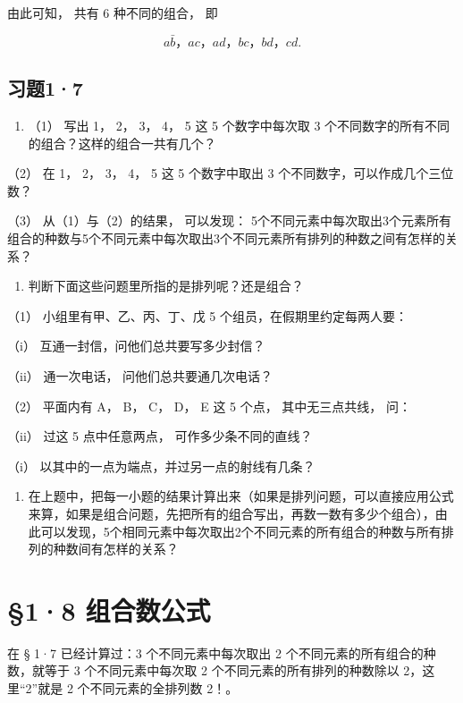 由此可知， 共有 6 种不同的组合， 即

\[
a \bar {b}\text{，} a c\text{，} a d\text{，} b c\text{，} b d\text{，} c d.
\]

\subsection{习题1·7}

\begin{enumerate}
\item
  （1） 写出 1， 2， 3， 4， 5 这 5 个数字中每次取 3
  个不同数字的所有不同的组合？这样的组合一共有几个？
\end{enumerate}

（2） 在 1， 2， 3， 4， 5 这 5 个数字中取出 3
个不同数字，可以作成几个三位数？

（3） 从（1）与（2）的结果， 可以发现：
5个不同元素中每次取出3个元素所有组合的种数与5个不同元素中每次取出3个不同元素所有排列的种数之间有怎样的关系？

\begin{enumerate}[start=2]
\item
  判断下面这些问题里所指的是排列呢？还是组合？
\end{enumerate}

（1） 小组里有甲、乙、丙、丁、戊 5 个组员，在假期里约定每两人要：

（i） 互通一封信，问他们总共要写多少封信？

（ii） 通一次电话， 问他们总共要通几次电话？

（2） 平面内有 A， B， C， D， E 这 5 个点， 其中无三点共线， 问：

（ii） 过这 5 点中任意两点， 可作多少条不同的直线？

（i） 以其中的一点为端点，并过另一点的射线有几条？

\begin{enumerate}[start=3]
\item
  在上题中，把每一小题的结果计算出来（如果是排列问题，可以直接应用公式来算，如果是组合问题，先把所有的组合写出，再数一数有多少个组合），由此可以发现，5个相同元素中每次取出2个不同元素的所有组合的种数与所有排列的种数间有怎样的关系？
\end{enumerate}

\section{§1·8 组合数公式}

在 § 1·7 已经计算过：3 个不同元素中每次取出 2
个不同元素的所有组合的种数，就等于 3 个不同元素中每次取 2
个不同元素的所有排列的种数除以 2，这里``2''就是 2 个不同元素的全排列数
2！。

